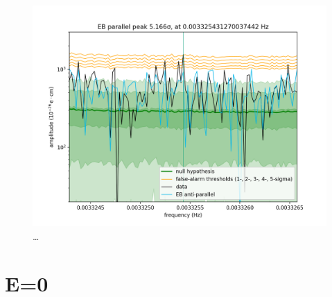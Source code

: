 \begin{figure}
  \centering
  \includegraphics[width=\linewidth]{gfx/axions/P_detection_peak_145440.png}
  \caption{\ldots}
  \label{fig:P_detection_peak_145440}
\end{figure}


\section{E=0}

